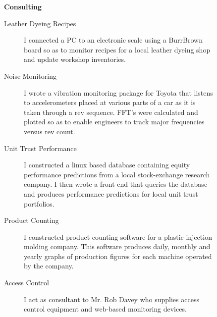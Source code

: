 \begin{description}\item[] \begin{description}\item[] {\large \bf  Consulting }
\begin{description}
 \item[ Leather Dyeing Recipes     ]  
          I connected a PC to an electronic scale using a BurrBrown
          board so as to monitor recipes for a local leather dyeing shop
          and update workshop inventories. 
 \item[ Noise Monitoring    ]  
          I wrote a vibration monitoring package for Toyota that listens to
          accelerometers placed at various parts of a car
          as it is taken through a rev sequence. 
          FFT's were calculated and plotted so as to
          enable engineers to track major frequencies versus rev count. 
 \item[ Unit Trust Performance     ]  
          I constructed a linux based database 
          containing equity performance
          predictions from a local stock-exchange research company. 
          I then wrote a front-end that queries the database
          and produces performance predictions for local unit trust portfolios.
 \item[ Product Counting    ]  
          I constructed product-counting software for
          a plastic injection molding company. This software produces daily,
          monthly and yearly graphs of production figures for each machine
          operated by the company.
 \item[ Access Control     ]  
          I act as consultant to Mr. Rob Davey who supplies 
          access control equipment and web-based monitoring
          devices. 
          
\end{description}
\end{description}
\end{description}

